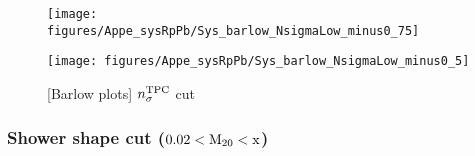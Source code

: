 \begin{itemize}
      \begin{figure}[H]
      \begin{minipage}{0.5\hsize} 
      \begin{center}
      \texttt{[image: figures/Appe\_sysRpPb/Sys\_barlow\_NsigmaLow\_minus0\_75]}
      \end{center}
      \end{minipage}
      \begin{minipage}{0.5\hsize} 
      \begin{center}
      \texttt{[image: figures/Appe\_sysRpPb/Sys\_barlow\_NsigmaLow\_minus0\_5]}
      \end{center}
      \end{minipage}
      \caption{[Barlow plots] $n_{\sigma}^{\rm{TPC}}$ cut}
      \label{fig:Sys_TPCNsigma}
      \end{figure}
      
  \end{itemize}
      
\subsubsection{Shower shape cut ($0.02 < \rm{M_{20}} < x $)}
\label{subsub:appe_sys_RpPb_M20}


